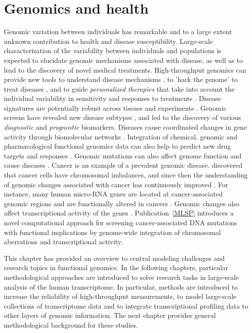 \section{Genomics and health}

Genomic variation between individuals has remarkable and to a large
extent unknown contribution to health and disease
susceptibility. Large-scale characterization of the variability
between individuals and populations is expected to elucidate genomic
mechanisms associated with disease, as well as to lead to the
discovery of novel medical treatments. High-throughput genomics can
provide new tools to understand disease mechanisms
\citep{Braga-Neto06, Lage08}, to 'hack the genome' \citep{Evanko06} to
treat diseases \citep{Volinia2010}, and to guide {\it personalized
  therapies} that take into account the individual variability in
sensitivity and responses to treatments \citep{Church05, Downward06,
  Foekens08, Ocana2010, vantVeer08}. Disease signatures are
potentially robust across tissues and experiments \citep{Dudley09,
  Hu06}. Genomic screens have revealed new disease subtypes
\citep{Bhattacharjee01}, and led to the discovery of various {\it
  diagnostic} \citep{Lee08c, Su09, Tibshirani02} and {\it prognostic}
\citep{Beer02} biomarkers. Diseases cause coordinated changes in gene
activity through biomolecular networks \citep{Cabusora05}. Integration
of chemical, genomic and pharmacological functional genomics data can
also help to predict new drug targets and responses \citep{Lamb06,
  Yamanishi2010}. Genomic mutations can also affect genome function
and cause diseases \citep{Taylor08}. Cancer is an example of a
prevalent genomic disease. \cite{Boveri1914} discovered that cancer
cells have chromosomal imbalances, and since then the understanding of
genomic changes associated with cancer has continuously improved
\citep{Stratton09, Wunderlich2007}.  For instance, many human
micro-RNA genes are located at cancer-associated genomic regions and
are functionally altered in cancers \citep[see][]{Calin06}. Genomic
changes also affect transcriptional activity of the genes
\citep{Myllykangas08jc}. Publication~\ref{MLSP} introduces a novel
computational approach for screening cancer-associated DNA mutations
with functional implications by genome-wide integration of chromosomal
aberrations and transcriptional activity.

This chapter has provided an overview to central modeling challenges
and research topics in functional genomics. In the following chapters,
particular methodological approaches are introduced to solve research
tasks in large-scale analysis of the human transcriptome. In
particular, methods are introduced to increase the reliability of
high-throughput measurements, to model large-scale collections of
transcriptome data and to integrate transcriptional profiling data to
other layers of genomic information. The next chapter provides general
methodological background for these studies.

